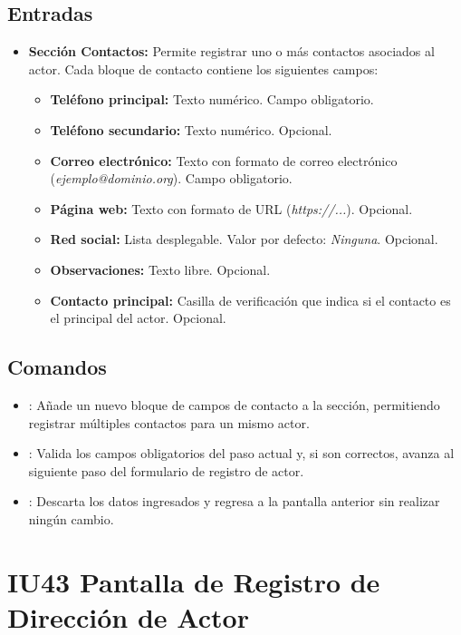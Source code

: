 \subsection{Entradas}
\begin{itemize}
	\item \textbf{Sección Contactos:} Permite registrar uno o más contactos 
	asociados al actor. Cada bloque de contacto contiene los siguientes campos:
	\begin{itemize}
		\item \textbf{Teléfono principal:} Texto numérico. Campo obligatorio.
		\item \textbf{Teléfono secundario:} Texto numérico. Opcional.
		\item \textbf{Correo electrónico:} Texto con formato de correo 
		electrónico (\textit{ejemplo@dominio.org}). Campo obligatorio.
		\item \textbf{Página web:} Texto con formato de URL 
		(\textit{https://...}). Opcional.
		\item \textbf{Red social:} Lista desplegable. Valor por defecto: 
		\textit{Ninguna}. Opcional.
		\item \textbf{Observaciones:} Texto libre. Opcional.
		\item \textbf{Contacto principal:} Casilla de verificación que indica 
		si el contacto es el principal del actor. Opcional.
	\end{itemize}
\end{itemize}

\subsection{Comandos}
\begin{itemize}
	\item {}: Añade un nuevo bloque de campos de 
	contacto a la sección, permitiendo registrar múltiples contactos para un 
	mismo actor.
	\item {}: Valida los campos obligatorios del paso actual 
	y, si son correctos, avanza al siguiente paso del formulario de registro de 
	actor.
	\item {}: Descarta los datos ingresados y regresa a la 
	pantalla anterior sin realizar ningún cambio.
\end{itemize}

\section{IU43 Pantalla de Registro de Dirección de Actor}
